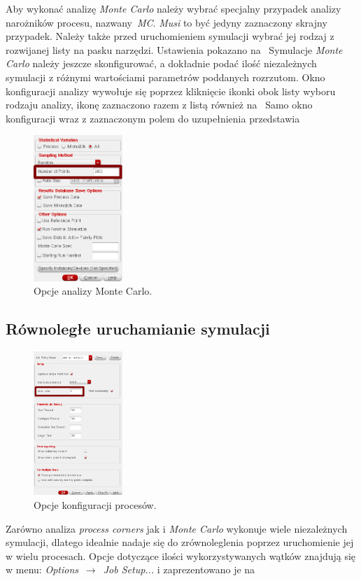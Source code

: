 \documentclass[twoside,pl,final]{labman}
\begin{document}
Aby wykonać analizę \emph{Monte Carlo} należy wybrać specjalny przypadek
analizy narożników procesu, nazwany~\emph{MC}.
\emph{Musi} to być jedyny zaznaczony skrajny przypadek.
Należy także przed uruchomieniem symulacji wybrać jej rodzaj z rozwijanej listy
na pasku narzędzi.
Ustawienia pokazano na~
Symulacje \emph{Monte Carlo} należy jeszcze skonfigurować,
a dokładnie podać ilość niezależnych symulacji z różnymi wartościami
parametrów poddanych rozrzutom.
Okno konfiguracji analizy wywołuje się poprzez kliknięcie ikonki
obok listy wyboru rodzaju analizy,
ikonę zaznaczono razem z listą również na~
Samo okno konfiguracji wraz z zaznaczonym polem do uzupełnienia
przedstawia~

\begin{figure}[!htbp]
  \centering
  \includegraphics[width=0.3\textwidth]{mc_setup}
  \caption{Opcje analizy Monte Carlo.}
  \label{fig:work:mc:setup}
\end{figure}

\subsection{Równoległe uruchamianie symulacji}
\label{work:parallel}

\begin{figure}[!htbp]
  \centering
  \includegraphics[width=0.3\textwidth]{jobs_setup}
  \caption{Opcje konfiguracji procesów.}
  \label{fig:work:jobs:setup}
\end{figure}

Zarówno analiza \emph{process corners} jak i \emph{Monte Carlo}
wykonuje wiele niezależnych symulacji,
dlatego idealnie nadaje się do zrównoleglenia poprzez uruchomienie jej
w wielu procesach.
Opcje dotyczące ilości wykorzystywanych wątków znajdują się w menu:
\emph{Options}~$\rightarrow$~\emph{Job Setup...}
i zaprezentowano je na~



\end{document}
